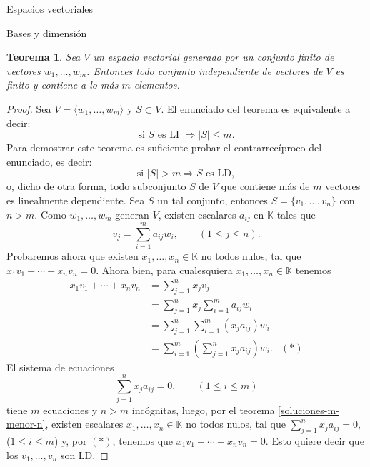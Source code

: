 \documentclass[a4paper,12pt,twoside,spanish,reqno]{amsbook}
\newtheorem{teorema}{Teorema}[section]
\theoremstyle{definition}
\theoremstyle{remark}
\newcommand{\la}{\langle}
\newcommand{\ra}{\rangle}
\newcommand{\K}{\mathbb K}
\begin{document}
\begin{chapter}{Espacios vectoriales}
\begin{section}{Bases y dimensión}
\begin{teorema}\label{indep-menorigual-gen}
    Sea $V$ un espacio vectorial generado por un conjunto finito de vectores $w_1,\ldots,w_m$. Entonces todo conjunto independiente de vectores de $V$ es finito y  contiene a lo más $m$ elementos. 
\end{teorema}
\begin{proof} Sea $V = \la w_1,\ldots,w_m\ra$ y  $S \subset V$.   El  enunciado del teorema es equivalente a decir:
    $$
    \text{si }S \text{ es LI } \Rightarrow |S| \le m.
    $$
    Para demostrar este teorema es suficiente probar el contrarrecíproco del enunciado, es decir:
    $$
    \text{si }|S| > m \Rightarrow S \text{ es LD},
    $$
    o, dicho  de otra forma, todo subconjunto $S$ de $V$ que contiene más de $m$ vectores es linealmente dependiente. Sea $S$ un tal conjunto,  entonces $S = \{v_1,\ldots,v_n\}$ con $n >m$.  Como  $w_1,\ldots,w_m$ generan $V$, existen escalares $a_{ij}$ en $\K$ tales que
    \begin{equation*}
        v_j = \sum_{i=1}^{m}a_{ij}w_i, \qquad (1 \le j \le n).
    \end{equation*}
    Probaremos ahora que existen $x_1,\ldots,x_n \in \K$ no todos nulos, tal que $x_1v_1 + \cdots+x_nv_n =0$. Ahora bien, para cualesquiera $x_1,\ldots,x_n \in \K$ tenemos
    \begin{align*}
        x_1v_1 + \cdots+x_nv_n &= \sum_{j=1}^{n} x_jv_j& \\
        & = \sum_{j=1}^{n}x_j \sum_{i=1}^{m}a_{ij}w_i& \\
        & = \sum_{j=1}^{n} \sum_{i=1}^{m}(x_ja_{ij})w_i& \\ 
        & = \sum_{i=1}^{m}(\sum_{j=1}^{n} x_ja_{ij})w_i.&  (*)
    \end{align*}
    El sistema de ecuaciones
    \begin{equation*}
        \sum_{j=1}^{n} x_ja_{ij} = 0, \qquad (1 \le i \le m) 
    \end{equation*}
    tiene $m$ ecuaciones  y $n > m$ incógnitas, luego, por el teorema \ref{soluciones-m-menor-n}, existen escalares $x_1,\ldots,x_n \in \K$ no todos nulos, tal que $\sum_{j=1}^{n} x_ja_{ij} = 0$, ($1 \le i \le m$) y, por $(*)$, tenemos que  $x_1v_1 + \cdots+x_nv_n =0$. Esto quiere decir que los $v_1,\ldots,v_n$ son LD.
\end{proof}



\end{section}
\end{chapter}
\end{document}
